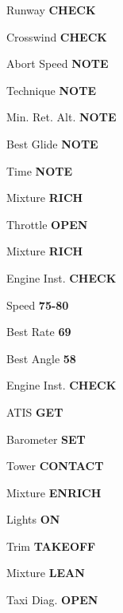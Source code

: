 \documentclass[8pt]{article}
\begin{document}
\begin{multicols*}{3}


\colorbox{green!80!red}{}

Runway \dotfill \textbf{CHECK}

Crosswind \dotfill \textbf{CHECK}

Abort Speed \dotfill \textbf{NOTE}

Technique \dotfill \textbf{NOTE}

Min. Ret. Alt. \dotfill \textbf{NOTE}

Best Glide \dotfill \textbf{NOTE}

Time \dotfill \textbf{NOTE}

Mixture \dotfill \textbf{RICH}

\colorbox{green!80!red}{}

Throttle \dotfill \textbf{OPEN}

\colorbox{orange!80}{}

Mixture \dotfill \textbf{RICH}

Engine Inst. \dotfill \textbf{CHECK}

Speed \dotfill \textbf{75-80}

Best Rate \dotfill \textbf{69}

Best Angle \dotfill \textbf{58}

\colorbox{green!80!red}{}

Engine Inst. \dotfill \textbf{CHECK}

ATIS \dotfill \textbf{GET}

Barometer \dotfill \textbf{SET}

Tower \dotfill \textbf{CONTACT}

Mixture \dotfill \textbf{ENRICH}

Lights \dotfill \textbf{ON}

\colorbox{green!80!red}{}

Trim \dotfill \textbf{TAKEOFF}

Mixture \dotfill \textbf{LEAN}

Taxi Diag. \dotfill \textbf{OPEN} \\

\colorbox{cyan}{}

\colorbox{cyan!70}{}


\end{multicols*}
\end{document}
